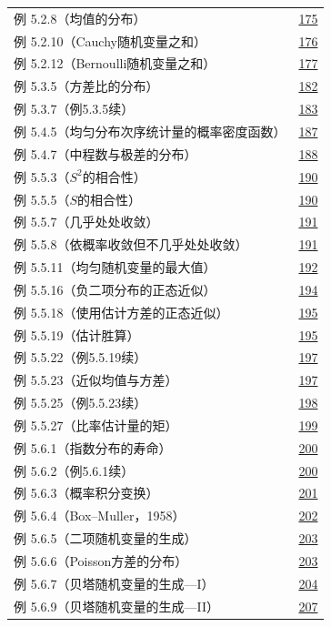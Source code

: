 \begin{longtable}{@{}p{}r@{}}
例 5.2.8（均值的分布） & \hyperref[ex:5.2.8]{175} \\
例 5.2.10（Cauchy随机变量之和） & \hyperref[ex:5.2.10]{176} \\
例 5.2.12（Bernoulli随机变量之和） & \hyperref[ex:5.2.12]{177} \\
例 5.3.5（方差比的分布） & \hyperref[ex:5.3.5]{182} \\
例 5.3.7（例5.3.5续） & \hyperref[ex:5.3.7]{183} \\
例 5.4.5（均匀分布次序统计量的概率密度函数） & \hyperref[ex:5.4.5]{187} \\
例 5.4.7（中程数与极差的分布） & \hyperref[ex:5.4.7]{188} \\
例 5.5.3（$S^2$的相合性） & \hyperref[ex:5.5.3]{190} \\
例 5.5.5（$S$的相合性） & \hyperref[ex:5.5.5]{190} \\
例 5.5.7（几乎处处收敛） & \hyperref[ex:5.5.7]{191} \\
例 5.5.8（依概率收敛但不几乎处处收敛） & \hyperref[ex:5.5.8]{191} \\
例 5.5.11（均匀随机变量的最大值） & \hyperref[ex:5.5.11]{192} \\
例 5.5.16（负二项分布的正态近似） & \hyperref[ex:5.5.16]{194} \\
例 5.5.18（使用估计方差的正态近似） & \hyperref[ex:5.5.18]{195} \\
例 5.5.19（估计胜算） & \hyperref[ex:5.5.19]{195} \\
例 5.5.22（例5.5.19续） & \hyperref[ex:5.5.22]{197} \\
例 5.5.23（近似均值与方差） & \hyperref[ex:5.5.23]{197} \\
例 5.5.25（例5.5.23续） & \hyperref[ex:5.5.25]{198} \\
例 5.5.27（比率估计量的矩） & \hyperref[ex:5.5.27]{199} \\
例 5.6.1（指数分布的寿命） & \hyperref[ex:5.6.1]{200} \\
例 5.6.2（例5.6.1续） & \hyperref[ex:5.6.2]{200} \\
例 5.6.3（概率积分变换） & \hyperref[ex:5.6.3]{201} \\
例 5.6.4（Box–Muller，1958） & \hyperref[ex:5.6.4]{202} \\
例 5.6.5（二项随机变量的生成） & \hyperref[ex:5.6.5]{203} \\
例 5.6.6（Poisson方差的分布） & \hyperref[ex:5.6.6]{203} \\
例 5.6.7（贝塔随机变量的生成—I） & \hyperref[ex:5.6.7]{204} \\
例 5.6.9（贝塔随机变量的生成—II） & \hyperref[ex:5.6.9]{207} \\

\end{longtable}

